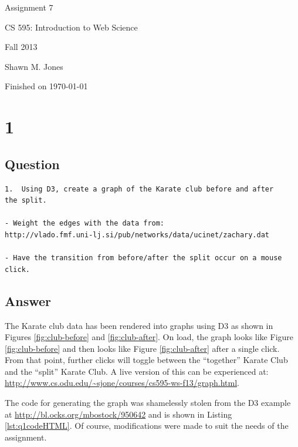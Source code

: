\documentclass[letterpaper,11pt]{article}
\begin{document}
\begin{titlepage}

\begin{center}

\Huge{Assignment 7}

\Large{CS 595:  Introduction to Web Science}

\Large{Fall 2013}

\Large{Shawn M. Jones}

\Large Finished on \today

\end{center}

\end{titlepage}

\newpage
\section*{1}

\subsection*{Question}

\begin{verbatim}
1.  Using D3, create a graph of the Karate club before and after
the split.

- Weight the edges with the data from: 
http://vlado.fmf.uni-lj.si/pub/networks/data/ucinet/zachary.dat

- Have the transition from before/after the split occur on a mouse
click.
\end{verbatim}

\newpage
\subsection*{Answer}

The Karate club data has been rendered into graphs using D3 as shown in Figures \ref{fig:club-before} and \ref{fig:club-after}.  On load, the graph looks like Figure \ref{fig:club-before} and then looks like Figure \ref{fig:club-after} after a single click.  From that point, further clicks will toggle between the ``together'' Karate Club and the ``split'' Karate Club. A live version of this can be experienced at: \url{http://www.cs.odu.edu/~sjone/courses/cs595-ws-f13/graph.html}.

The code for generating the graph was shamelessly stolen from the D3 example at \url{http://bl.ocks.org/mbostock/950642} and is shown in Listing \ref{lst:q1codeHTML}.  Of course, modifications were made to suit the needs of the assignment.
\end{document}
